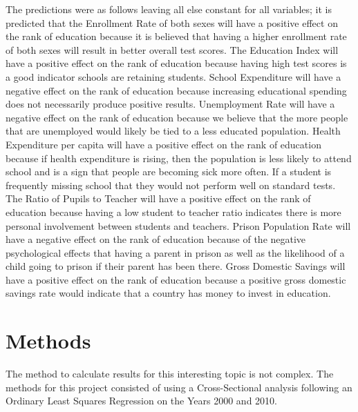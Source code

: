 \documentclass[12pt,english]{article}
\begin{document}
The predictions were as follows leaving all else constant for all variables; it is predicted that the Enrollment Rate of both sexes will have a positive effect on the rank of education because it is believed that having a higher enrollment rate of both sexes will result in better overall test scores. The Education Index will have a positive effect on the rank of education because having high test scores is a good indicator schools are retaining students. School Expenditure will have a negative effect on the rank of education because increasing educational spending does not necessarily produce positive results. Unemployment Rate will have a negative effect on the rank of education because we believe that the more people that are unemployed would likely be tied to a less educated population.  Health Expenditure per capita will have a positive effect on the rank of education because if health expenditure is rising, then the population is less likely to attend school and is a sign that people are becoming sick more often. If a student is frequently missing school that they would not perform well on standard tests. The Ratio of Pupils to Teacher will have a positive effect on the rank of education because having a low student to teacher ratio indicates there is more personal involvement between students and teachers. Prison Population Rate will have a negative effect on the rank of education because of the negative psychological effects that having a parent  in prison as well as the likelihood of a child going to prison if their parent has been there. Gross Domestic Savings will have a positive effect on the rank of education because a positive gross domestic savings rate would indicate that a country has money to invest in education.

\section{Methods}
The method to calculate results for this interesting topic is not complex. The methods for this project consisted of using a Cross-Sectional analysis following an Ordinary Least Squares Regression on the Years 2000 and 2010.
\end{document}
